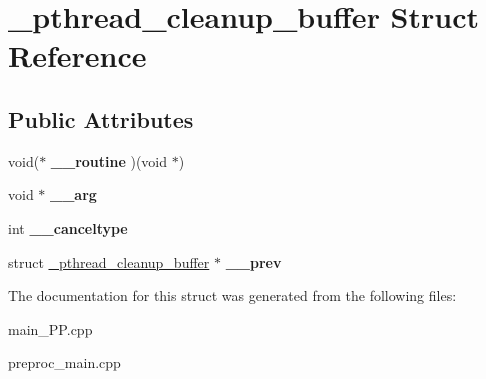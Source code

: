 \hypertarget{struct__pthread__cleanup__buffer}{\section{\+\_\+pthread\+\_\+cleanup\+\_\+buffer Struct Reference}
\label{struct__pthread__cleanup__buffer}
}
\subsection*{Public Attributes}
\begin{DoxyCompactItemize}
\item 
\hypertarget{struct__pthread__cleanup__buffer_a11caebe684aa31e469c8f256422956cb}{void($\ast$ {\bfseries \+\_\+\+\_\+routine} )(void $\ast$)}\label{struct__pthread__cleanup__buffer_a11caebe684aa31e469c8f256422956cb}

\item 
\hypertarget{struct__pthread__cleanup__buffer_af6714f832243bc7cb4befa3c015b9f1c}{void $\ast$ {\bfseries \+\_\+\+\_\+arg}}\label{struct__pthread__cleanup__buffer_af6714f832243bc7cb4befa3c015b9f1c}

\item 
\hypertarget{struct__pthread__cleanup__buffer_a85a557634a2c74d5946c2a3f4002a280}{int {\bfseries \+\_\+\+\_\+canceltype}}\label{struct__pthread__cleanup__buffer_a85a557634a2c74d5946c2a3f4002a280}

\item 
\hypertarget{struct__pthread__cleanup__buffer_ac801a7646b3b2dfd948e29ec606e27fd}{struct \hyperlink{struct__pthread__cleanup__buffer}{\+\_\+pthread\+\_\+cleanup\+\_\+buffer} $\ast$ {\bfseries \+\_\+\+\_\+prev}}\label{struct__pthread__cleanup__buffer_ac801a7646b3b2dfd948e29ec606e27fd}

\end{DoxyCompactItemize}


The documentation for this struct was generated from the following files\+:\begin{DoxyCompactItemize}
\item 
main\+\_\+\+P\+P.\+cpp\item 
preproc\+\_\+main.\+cpp\end{DoxyCompactItemize}
